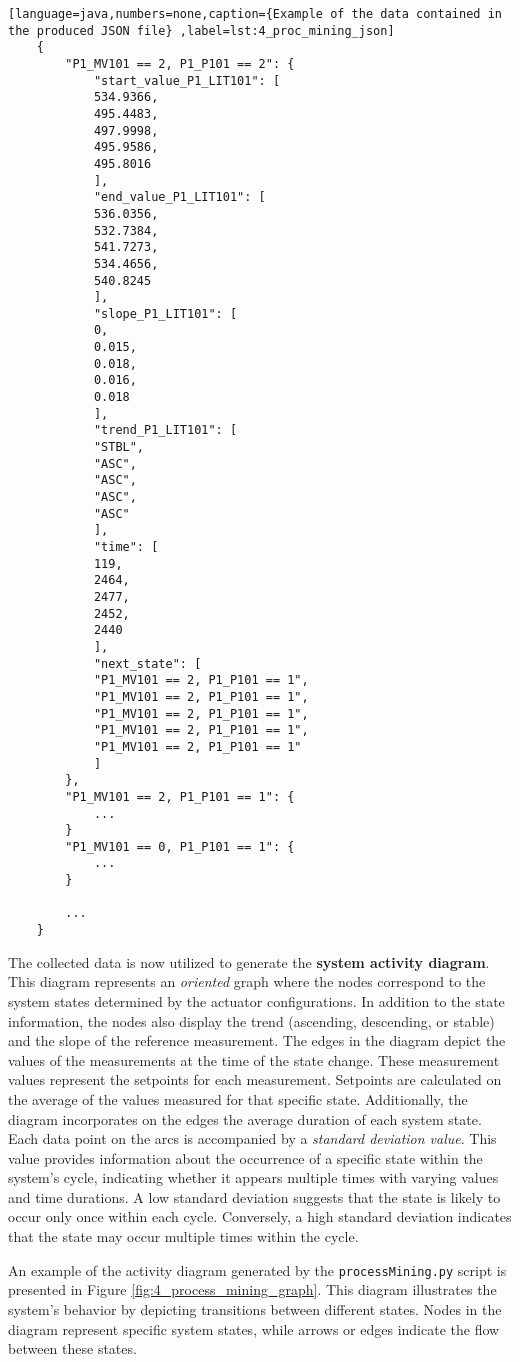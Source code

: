 \begin{lstlisting}[language=java,numbers=none,caption={Example of the data contained in the produced JSON file} ,label=lst:4_proc_mining_json]
	{
		"P1_MV101 == 2, P1_P101 == 2": {
			"start_value_P1_LIT101": [
			534.9366,
			495.4483,
			497.9998,
			495.9586,
			495.8016
			],
			"end_value_P1_LIT101": [
			536.0356,
			532.7384,
			541.7273,
			534.4656,
			540.8245
			],
			"slope_P1_LIT101": [
			0,
			0.015,
			0.018,
			0.016,
			0.018
			],
			"trend_P1_LIT101": [
			"STBL",
			"ASC",
			"ASC",
			"ASC",
			"ASC"
			],
			"time": [
			119,
			2464,
			2477,
			2452,
			2440
			],
			"next_state": [
			"P1_MV101 == 2, P1_P101 == 1",
			"P1_MV101 == 2, P1_P101 == 1",
			"P1_MV101 == 2, P1_P101 == 1",
			"P1_MV101 == 2, P1_P101 == 1",
			"P1_MV101 == 2, P1_P101 == 1"
			]
		},
		"P1_MV101 == 2, P1_P101 == 1": {
			...
		}
		"P1_MV101 == 0, P1_P101 == 1": {
			...
		}
		
		...
	}
\end{lstlisting}

The collected data is now utilized to generate the \textbf{system activity diagram}. This diagram represents an \textit{oriented} graph where the nodes correspond to the system states determined by the actuator configurations. In addition to the state information, the nodes also display the trend (ascending, descending, or stable) and the slope of the reference measurement.\newline
The edges in the diagram depict the values of the measurements at the time of the state change. These measurement values represent the setpoints for each measurement. Setpoints are calculated on the average of the values measured for that specific state. Additionally, the diagram incorporates on the edges the average duration of each system state.\newline
Each data point on the arcs is accompanied by a \textit{standard deviation value}. This value provides information about the occurrence of a specific state within the system's cycle, indicating whether it appears multiple times with varying values and time durations. A low standard deviation suggests that the state is likely to occur only once within each cycle. Conversely, a high standard deviation indicates that the state may occur multiple times within the cycle.

\bigskip
An example of the activity diagram generated by the \texttt{processMining.py} script is presented in Figure \ref{fig:4_process_mining_graph}. This diagram illustrates the system's behavior by depicting transitions between different states. Nodes in the diagram represent specific system states, while arrows or edges indicate the flow between these states.

